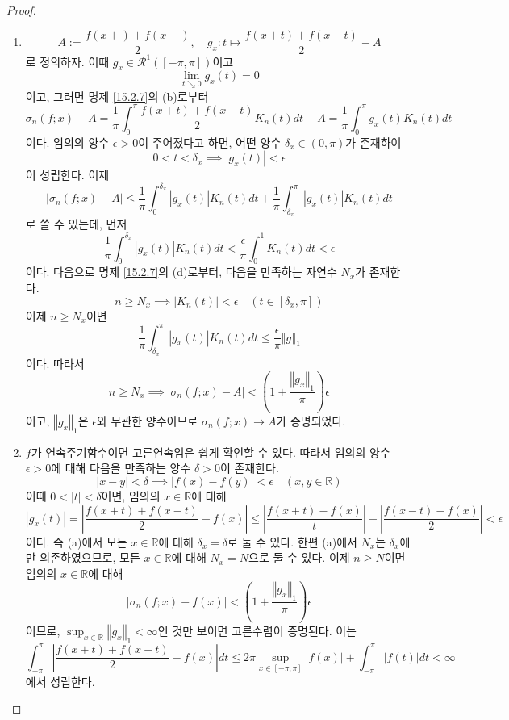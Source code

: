 \documentclass[11pt]{book}
\numberwithin{equation}{chapter}
\def\RR{\mathbb{R}}
\def\eps{\epsilon}
\def\calR{\mathcal{R}}
\newcommand{\abs}[1]{\left\vert#1\right\vert}
\newcommand{\norm}[1]{\left\Vert#1\right\Vert}
\newcommand{\paren}[1]{\left(#1\right)}
\theoremstyle{definition}
\newenvironment{enum}
	{\begin{enumerate}[label=(\alph*), leftmargin=2\parindent]}
	{\end{enumerate}}
\begin{document}
\begin{proof}
    \begin{enum}
        \item
        \[
            A := \frac{f(x+) + f(x-)}{2}, \quad g_x : t \mapsto \frac{f(x+t) + f(x-t)}{2} - A
        \]
        로 정의하자. 이때 \(g_x \in \calR^1([-\pi, \pi])\)이고
        \[
            \lim_{t \searrow 0} g_x(t) = 0
        \]
        이고, 그러면 명제 \ref{15.2.7}의 (b)로부터
        \[
            \sigma_n(f; x) - A = \frac{1}{\pi} \int_0^\pi \frac{f(x+t) + f(x-t)}{2} K_n(t) dt - A = \frac{1}{\pi} \int_0^\pi g_x(t) K_n(t) dt
        \]
        이다. 임의의 양수 \(\eps > 0\)이 주어졌다고 하면, 어떤 양수 \(\delta_x \in (0, \pi)\)가 존재하여 
        \[
            0 < t < \delta_x \implies \abs{g_x(t)} < \eps
        \]
        이 성립한다. 이제
        \[
            \abs{\sigma_n(f; x) - A} \le \frac{1}{\pi} \int_0^{\delta_x} \abs{g_x(t)}K_n(t) dt + \frac{1}{\pi} \int_{\delta_x}^{\pi} \abs{g_x(t)}K_n(t) dt
        \]
        로 쓸 수 있는데, 먼저
        \[
            \frac{1}{\pi} \int_0^{\delta_x} \abs{g_x(t)}K_n(t) dt <  \frac{\eps}{\pi} \int_0^1 K_n(t) dt < \eps
        \]
        이다. 다음으로 명제 \ref{15.2.7}의 (d)로부터, 다음을 만족하는 자연수 \(N_x\)가 존재한다.
        \[
            n \ge N_x \implies \abs{K_n(t)} < \eps \quad (t \in [\delta_x, \pi])
        \]
        이제 \(n \ge N_x\)이면
        \[
            \frac{1}{\pi} \int_{\delta_x}^{\pi} \abs{g_x(t)}K_n(t) dt \le \frac{\eps}{\pi} \norm{g}_1
        \]
        이다. 따라서
        \[
            n \ge N_x \implies \abs{\sigma_n(f; x) - A} < \paren{1 + \frac{\norm{g_x}_1}{\pi}}\eps
        \]
        이고, \(\norm{g_x}_1\)은 \(\eps\)와 무관한 양수이므로 \(\sigma_n(f; x) \to A\)가 증명되었다.
        \item \(f\)가 연속주기함수이면 고른연속임은 쉽게 확인할 수 있다. 따라서 임의의 양수 \(\eps > 0\)에 대해 다음을 만족하는 양수 \(\delta > 0\)이 존재한다.
        \[
            \abs{x - y} < \delta \implies \abs{f(x) - f(y)} < \eps \quad (x, y \in \RR)
        \]
        이때 \(0 < \abs{t} < \delta\)이면, 임의의 \(x \in \RR\)에 대해
        \[
            \abs{g_x(t)} = \abs{\frac{f(x+t) + f(x-t)}{2} - f(x)} \le \abs{\frac{f(x+t) - f(x)}{t}} + \abs{\frac{f(x-t) - f(x)}{2}} < \eps
        \]
        이다. 즉 (a)에서 모든 \(x \in \RR\)에 대해 \(\delta_x = \delta\)로 둘 수 있다. 한편 (a)에서 \(N_x\)는 \(\delta_x\)에만 의존하였으므로, 모든 \(x \in \RR\)에 대해 \(N_x = N\)으로 둘 수 있다. 이제 \(n \ge N\)이면 임의의 \(x \in \RR\)에 대해
        \[
            \abs{\sigma_n(f; x) - f(x)} < \paren{1 + \frac{\norm{g_x}_1}{\pi}}\eps
        \]
        이므로, \(\sup_{x \in \RR} \norm{g_x}_1 < \infty\)인 것만 보이면 고른수렴이 증명된다. 이는
        \[
            \int_{-\pi}^\pi \abs{\frac{f(x+t) + f(x-t)}{2} - f(x)} dt \le 2\pi \sup_{x \in [-\pi, \pi]} \abs{f(x)} + \int_{-\pi}^\pi \abs{f(t)} dt < \infty
        \]
        에서 성립한다.
    \end{enum}
\end{proof}
\end{document}

